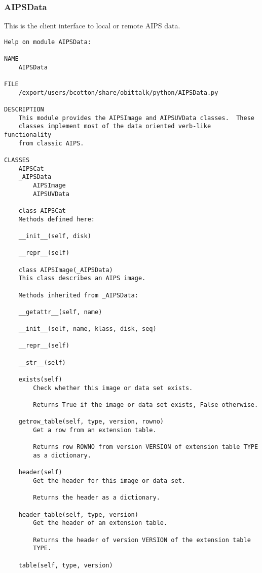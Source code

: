 \documentclass[11pt]{report}
\begin{document}
\subsubsection{AIPSData}
This is the client interface to local or remote AIPS data.
\begin{verbatim}
Help on module AIPSData:

NAME
    AIPSData

FILE
    /export/users/bcotton/share/obittalk/python/AIPSData.py

DESCRIPTION
    This module provides the AIPSImage and AIPSUVData classes.  These
    classes implement most of the data oriented verb-like functionality
    from classic AIPS.

CLASSES
    AIPSCat
    _AIPSData
        AIPSImage
        AIPSUVData
    
    class AIPSCat
    Methods defined here:
    
    __init__(self, disk)
    
    __repr__(self)
    
    class AIPSImage(_AIPSData)
    This class describes an AIPS image.
    
    Methods inherited from _AIPSData:
    
    __getattr__(self, name)
    
    __init__(self, name, klass, disk, seq)
    
    __repr__(self)
    
    __str__(self)
    
    exists(self)
        Check whether this image or data set exists.
        
        Returns True if the image or data set exists, False otherwise.
    
    getrow_table(self, type, version, rowno)
        Get a row from an extension table.
        
        Returns row ROWNO from version VERSION of extension table TYPE
        as a dictionary.
    
    header(self)
        Get the header for this image or data set.
        
        Returns the header as a dictionary.
    
    header_table(self, type, version)
        Get the header of an extension table.
        
        Returns the header of version VERSION of the extension table
        TYPE.
    
    table(self, type, version)
    

\end{verbatim}
\end{document}
